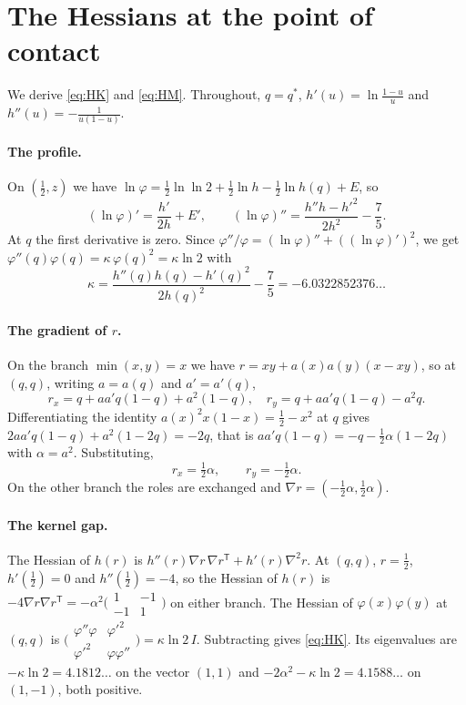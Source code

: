 \documentclass[aps,prd,twocolumn,superscriptaddress,nofootinbib,longbibliography,floatfix,amsmath,amssymb,10pt]{revtex4-2}
\theoremstyle{plain}
\theoremstyle{definition}
\theoremstyle{plain}
\newcommand{\qs}{q^{*}}
\begin{document}
\section{The Hessians at the point of contact}\label{app:hessian}

We derive \eqref{eq:HK} and \eqref{eq:HM}. Throughout, $q=\qs$, $h'(u)=\ln\frac{1-u}{u}$ and $h''(u)=-\frac{1}{u(1-u)}$.

\paragraph*{The profile.} On $(\frac12,z)$ we have $\ln\varphi=\frac12\ln\ln 2+\frac12\ln h-\frac12\ln h(q)+E$, so
\[
(\ln\varphi)'=\frac{h'}{2h}+E',\qquad (\ln\varphi)''=\frac{h''h-h'^2}{2h^2}-\frac75 .
\]
At $q$ the first derivative is zero. Since $\varphi''/\varphi=(\ln\varphi)''+((\ln\varphi)')^2$, we get $\varphi''(q)\varphi(q)=\kappa\,\varphi(q)^2=\kappa\ln 2$ with
\[
\kappa=\frac{h''(q)h(q)-h'(q)^2}{2h(q)^2}-\frac75=-6.0322852376\ldots
\]

\paragraph*{The gradient of $r$.} On the branch $\min(x,y)=x$ we have $r=xy+a(x)a(y)(x-xy)$, so at $(q,q)$, writing $a=a(q)$ and $a'=a'(q)$,
\[
r_x=q+aa'q(1-q)+a^2(1-q),\quad r_y=q+aa'q(1-q)-a^2q .
\]
Differentiating the identity $a(x)^2x(1-x)=\frac12-x^2$ at $q$ gives $2aa'q(1-q)+a^2(1-2q)=-2q$, that is $aa'q(1-q)=-q-\frac12\alpha(1-2q)$ with $\alpha=a^2$. Substituting,
\[
r_x=\tfrac12\alpha,\qquad r_y=-\tfrac12\alpha .
\]
On the other branch the roles are exchanged and $\nabla r=(-\frac12\alpha,\frac12\alpha)$.

\paragraph*{The kernel gap.} The Hessian of $h(r)$ is $h''(r)\nabla r\,\nabla r^{\mathsf T}+h'(r)\nabla^2r$. At $(q,q)$, $r=\frac12$, $h'(\frac12)=0$ and $h''(\frac12)=-4$, so the Hessian of $h(r)$ is $-4\nabla r\nabla r^{\mathsf T}=-\alpha^2\bigl(\begin{smallmatrix}1&-1\\-1&1\end{smallmatrix}\bigr)$ on either branch. The Hessian of $\varphi(x)\varphi(y)$ at $(q,q)$ is $\bigl(\begin{smallmatrix}\varphi''\varphi&\varphi'^2\\ \varphi'^2&\varphi\varphi''\end{smallmatrix}\bigr)=\kappa\ln 2\,I$. Subtracting gives \eqref{eq:HK}. Its eigenvalues are $-\kappa\ln 2=4.1812\ldots$ on the vector $(1,1)$ and $-2\alpha^2-\kappa\ln2=4.1588\ldots$ on $(1,-1)$, both positive.
\end{document}

